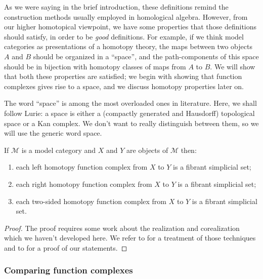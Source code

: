 As we were saying in the brief introduction, these definitions remind the construction methods usually employed in homological algebra. However, from our higher homotopical viewpoint, we have some properties that those definitions should satisfy, in order to be \emph{good} definitions. For example, if we think model categories as presentations of a homotopy theory, the maps between two objects $A$ and $B$ should be organized in a ``space'', and the path-components of this space should be in bijection with homotopy classes of maps from $A$ to $B$. We will show that both these properties are satisfied; we begin with showing that function complexes gives rise to a space, and we discuss homotopy properties later on.

\begin{rmk}
The word ``space'' is among the most overloaded ones in literature. Here, we shall follow Lurie: a space is either a (compactly generated and Hausdorff) topological space or a Kan complex. We don't want to really distinguish between them, so we will use the generic word space.
\end{rmk}

\begin{prop}
If $\mathcal M$ is a model category and $X$ and $Y$ are objects of $\mathcal M$ then:
\begin{enumerate}
\item each left homotopy function complex from $X$ to $Y$ is a fibrant simplicial set;
\item each right homotopy function complex from $X$ to $Y$ is a fibrant simplicial set;
\item each two-sided homotopy function complex from $X$ to $Y$ is a fibrant simplicial set.
\end{enumerate}
\end{prop}

\begin{proof}
The proof requires some work about the realization and corealization which we haven't developed here. We refer to \cite[Ch. 16.3]{hirschhorn} for a treatment of those techniques and to \cite[Propositions 17.1.3, 17.2.3, 17.3.2]{hirschhorn} for a proof of our statements.
\end{proof}

\subsubsection*{Comparing function complexes}

